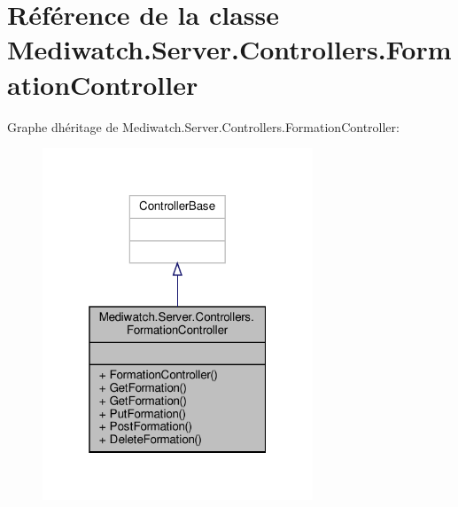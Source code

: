 \hypertarget{class_mediwatch_1_1_server_1_1_controllers_1_1_formation_controller}{}\section{Référence de la classe Mediwatch.\+Server.\+Controllers.\+Formation\+Controller}
\label{class_mediwatch_1_1_server_1_1_controllers_1_1_formation_controller}


Graphe d\textquotesingle{}héritage de Mediwatch.\+Server.\+Controllers.\+Formation\+Controller\+:
\nopagebreak
\begin{figure}[H]
\begin{center}
\leavevmode
\includegraphics[width=229pt]{class_mediwatch_1_1_server_1_1_controllers_1_1_formation_controller__inherit__graph}
\end{center}
\end{figure}


